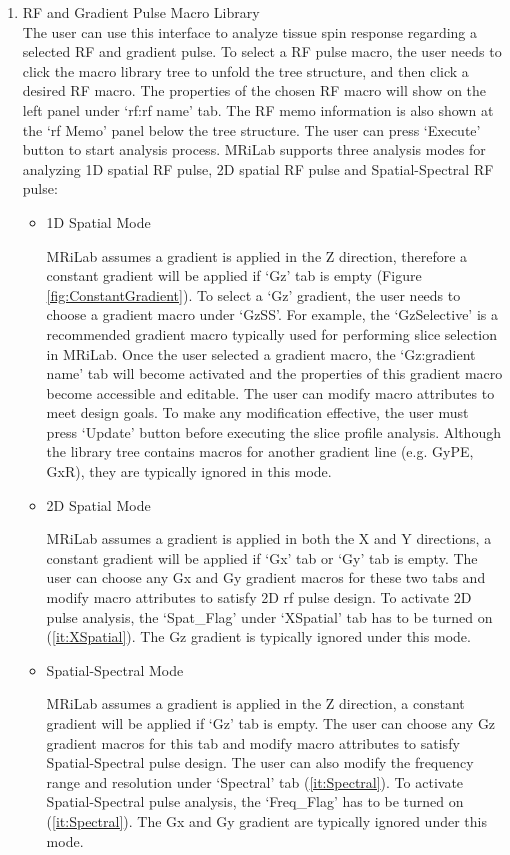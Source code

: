 \documentclass{book}%
\begin{document}
\begin{enumerate}
	\item RF and Gradient Pulse Macro Library \\

The user can use this interface to analyze tissue spin response regarding a selected RF and gradient pulse. To select a RF pulse macro, the user needs to click the macro library tree to unfold the tree structure, and then click a desired RF macro. The properties of the chosen RF macro will show on the left panel under `rf:rf name' tab. The RF memo information is also shown at the `rf Memo' panel below the tree structure. The user can press `Execute' button to start analysis process. MRiLab supports three analysis modes for analyzing 1D spatial RF pulse, 2D spatial RF pulse and Spatial-Spectral RF pulse:

\begin{itemize}
	\item 1D Spatial Mode
	
MRiLab assumes a gradient is applied in the Z direction, therefore a constant gradient will be applied if `Gz' tab is empty (Figure \ref{fig:ConstantGradient}). To select a `Gz' gradient, the user needs to choose a gradient macro under `GzSS'. For example, the `GzSelective' is a recommended gradient macro typically used for performing slice selection in MRiLab. Once the user selected a gradient macro, the `Gz:gradient name' tab will become activated and the properties of this gradient macro become accessible and editable. The user can modify macro attributes to meet design goals. To make any modification effective, the user must press `Update' button before executing the slice profile analysis. Although the library tree contains macros for another gradient line (e.g. GyPE, GxR), they are typically ignored in this mode.
	\item 2D Spatial Mode

MRiLab assumes a gradient is applied in both the X and Y directions, a constant gradient will be applied if `Gx' tab or `Gy' tab is empty. The user can choose any Gx and Gy gradient macros for these two tabs and modify macro attributes to satisfy 2D rf pulse design. To activate 2D pulse analysis, the `Spat\_Flag' under `XSpatial' tab has to be turned on (\ref{it:XSpatial}). The Gz gradient is typically ignored under this mode.

	\item Spatial-Spectral Mode
	
MRiLab assumes a gradient is applied in the Z direction, a constant gradient will be applied if `Gz' tab is empty. The user can choose any Gz gradient macros for this tab and modify macro attributes to satisfy Spatial-Spectral pulse design. The user can also modify the frequency range and resolution under `Spectral' tab (\ref{it:Spectral}). To activate Spatial-Spectral pulse analysis, the `Freq\_Flag' has to be turned on (\ref{it:Spectral}). The Gx and Gy gradient are typically ignored under this mode.


\end{itemize}
\end{enumerate}
\end{document}
